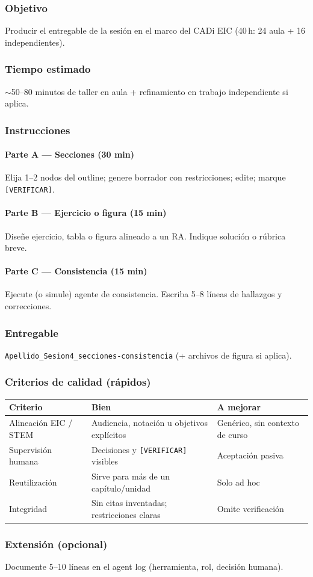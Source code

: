 \subsubsection*{Objetivo}
Producir el entregable de la sesión en el marco del CADi EIC (40\,h: 24 aula + 16 independientes).

\subsubsection*{Tiempo estimado}
$\sim$50--80 minutos de taller en aula + refinamiento en trabajo independiente si aplica.

\subsubsection*{Instrucciones}
\paragraph{Parte A --- Secciones (30 min)} Elija 1--2 nodos del outline; genere borrador con restricciones; edite; marque \texttt{[VERIFICAR]}.
\paragraph{Parte B --- Ejercicio o figura (15 min)} Diseñe ejercicio, tabla o figura alineado a un RA. Indique solución o rúbrica breve.
\paragraph{Parte C --- Consistencia (15 min)} Ejecute (o simule) agente de consistencia. Escriba 5--8 líneas de hallazgos y correcciones.

\subsubsection*{Entregable}
\texttt{Apellido\_Sesion4\_secciones-consistencia} (+ archivos de figura si aplica).

\subsubsection*{Criterios de calidad (rápidos)}
\begin{tabularx}{\textwidth}{@{}lXX@{}}
\toprule
Criterio & Bien & A mejorar \\
\midrule
Alineación EIC / STEM & Audiencia, notación u objetivos explícitos & Genérico, sin contexto de curso \\
Supervisión humana & Decisiones y \texttt{[VERIFICAR]} visibles & Aceptación pasiva \\
Reutilización & Sirve para más de un capítulo/unidad & Solo ad hoc \\
Integridad & Sin citas inventadas; restricciones claras & Omite verificación \\
\bottomrule
\end{tabularx}

\subsubsection*{Extensión (opcional)}
Documente 5--10 líneas en el agent log (herramienta, rol, decisión humana).
